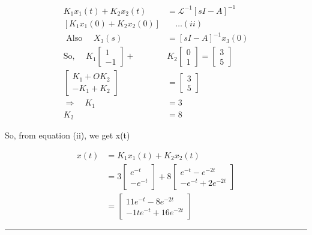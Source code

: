 \documentclass[11pt,a4paper]{article}
\begin{document}
\begin{tcolorbox}[solbox, title=Detailed Solution -- Question 96]
\[
\begin{aligned} K_{1} x_{1}(t)+K_{2} x_{2}(t)&=\mathcal{L}^{-1}[s I-A]^{-1} \\  \left[K_{1} x_{1}(0)+K_{2} x_{2}(0)\right] & \quad \ldots(ii)\\ \text { Also } \quad X_{3}(s)&=[s I-A]^{-1} x_{3}(0) \\ \text{So, } \quad K_{1}\left[\begin{array}{r}1 \\ -1\end{array}\right]+&K_{2}\left[\begin{array}{l}0 \\ 1\end{array}\right]=\left[\begin{array}{l}3 \\ 5\end{array}\right] \\ \left[\begin{array}{l}K_{1}+O K_{2} \\ -K_{1}+K_{2}\end{array}\right]&=\left[\begin{array}{l}3 \\ 5\end{array}\right] \\ \Rightarrow \quad K_{1}&=3 \\ K_{2}&=8 \end{aligned}
\]

 So, from equation (ii), we get x(t)

\[
\begin{aligned} x(t) &=K_{1} x_{1}(t)+K_{2} x_{2}(t) \\ &=3\left[\begin{array}{c} e^{-t} \\ -e^{-t} \end{array}\right]+8\left[\begin{array}{c} e^{-t}-e^{-2 t} \\ -e^{-t}+2 e^{-2 t} \end{array}\right] \\ &=\left[\begin{array}{c} 11 e^{-t}-8 e^{-2 t} \\ -1 t e^{-t}+16 e^{-2 t} \end{array}\right] \end{aligned}
\]
\end{tcolorbox}

\vspace{1.5em}
\hrule
\vspace{1.5em}
\end{document}
